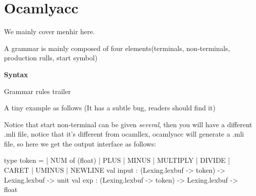 \section{Ocamlyacc}
We mainly cover menhir here.

A grammar is mainly composed of four elements(terminals,
non-terminals, production rulls, start symbol)

\textbf{Syntax}


\begin{bluetext}
    Grammar rules 
    trailer 
\end{bluetext}


A tiny example as follows (It has a subtle bug, readers should find it)  

Notice that start non-terminal can be given \textit{several}, then you will
have a different .mli file, notice that it's different from ocamllex,
ocamlyacc will generate a .mli file, so here we get the output
interface as follows:

\begin{bluetext}
\end{bluetext}

\begin{ocamlcode}
type token =
  | NUM of (float)
  | PLUS
  | MINUS
  | MULTIPLY
  | DIVIDE
  | CARET
  | UMINUS
  | NEWLINE
val input :
  (Lexing.lexbuf  -> token) -> Lexing.lexbuf -> unit
val exp :
  (Lexing.lexbuf  -> token) -> Lexing.lexbuf -> float
\end{ocamlcode}

